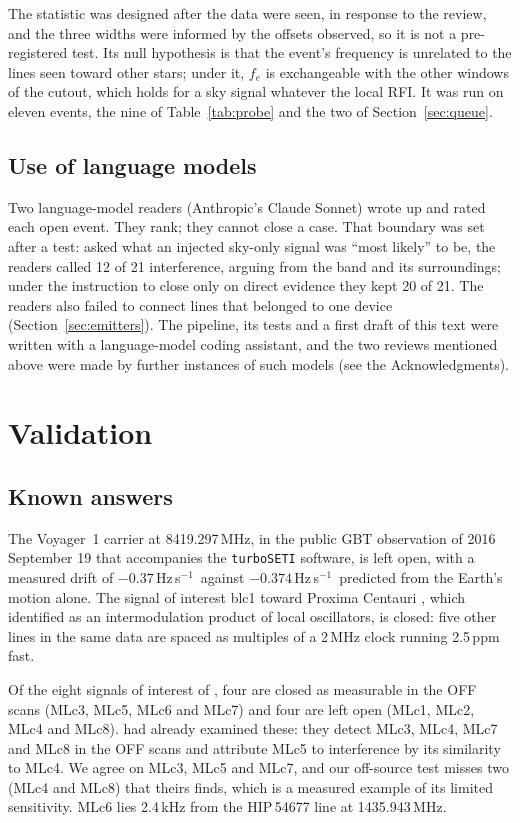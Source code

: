 \documentclass[twocolumn]{aastex631}
\newcommand{\hzs}{Hz\,s$^{-1}$}
\begin{document}
The statistic was designed after the data were seen, in response to the
review, and the three widths were informed by the offsets observed, so it is
not a pre-registered test. Its null hypothesis is that the event's
frequency is unrelated to the lines seen toward other stars; under it, $f_e$
is exchangeable with the other windows of the cutout, which holds for a sky
signal whatever the local RFI. It was run on eleven events, the nine of
Table~\ref{tab:probe} and the two of Section~\ref{sec:queue}.

\subsection{Use of language models} \label{sec:ai}

Two language-model readers (Anthropic's Claude Sonnet) wrote up and rated
each open event. They rank; they cannot close a case. That boundary was set
after a test: asked what an injected sky-only signal was ``most likely'' to
be, the readers called 12 of 21 interference, arguing from the band and its
surroundings; under the instruction to close only on direct evidence they
kept 20 of 21. The readers also failed to connect lines that belonged to one
device (Section~\ref{sec:emitters}). The pipeline, its tests and a first
draft of this text were written with a language-model coding assistant, and
the two reviews mentioned above were made by further instances of such
models (see the Acknowledgments).

\section{Validation} \label{sec:validation}

\subsection{Known answers}

The Voyager~1 carrier at 8419.297\,MHz, in the public GBT observation of
2016 September 19 that accompanies the \texttt{turboSETI} software, is left
open, with a measured drift of $-0.37$\,\hzs\ against $-0.374$\,\hzs\
predicted from the Earth's motion alone. The signal of interest blc1 toward
Proxima Centauri \citep{Smith2021}, which \citet{Sheikh2021} identified as
an intermodulation product of local oscillators, is closed: five other lines
in the same data are spaced as multiples of a 2\,MHz clock running 2.5\,ppm
fast.

Of the eight signals of interest of \citet{Ma2023}, four are closed as
measurable in the OFF scans (MLc3, MLc5, MLc6 and MLc7) and four are left
open (MLc1, MLc2, MLc4 and MLc8). \citet{Margot2023} had already examined
these: they detect MLc3, MLc4, MLc7 and MLc8 in the OFF scans and attribute
MLc5 to interference by its similarity to MLc4. We agree on MLc3, MLc5 and
MLc7, and our off-source test misses two (MLc4 and MLc8) that theirs finds,
which is a measured example of its limited sensitivity. MLc6 lies 2.4\,kHz
from the HIP\,54677 line at 1435.943\,MHz.
\end{document}
